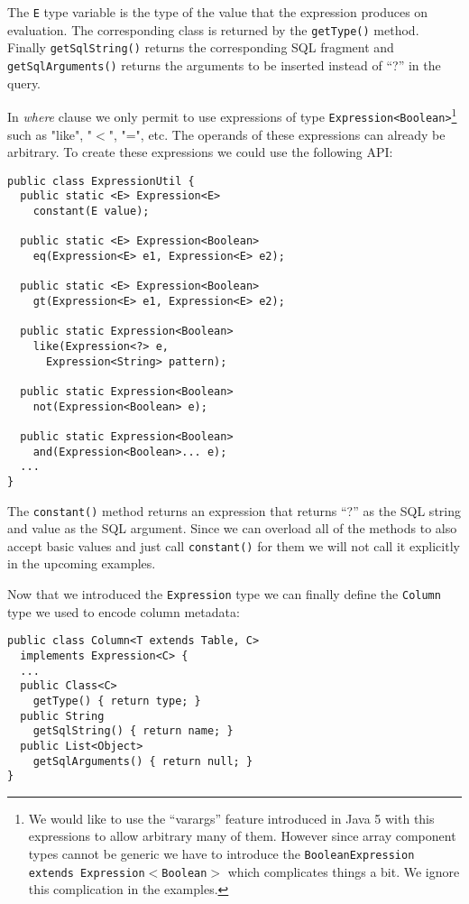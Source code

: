 \documentclass{sig-alternate}
\begin{document}
The \verb!E! type variable is the type of the value that the expression produces on evaluation. The corresponding class is returned by the \verb!getType()! method. Finally \verb!getSqlString()! returns the corresponding SQL fragment and \verb!getSqlArguments()! returns the arguments to be inserted instead of ``?'' in the query. 

In \emph{where} clause we only permit to use expressions of type \verb!Expression<Boolean>!\footnote{We would like to use the ``varargs'' feature introduced in Java 5 with this expressions to allow arbitrary many of them. However since array component types cannot be generic we have to introduce the \texttt{BooleanExpression extends Expression$<$Boolean$>$} which complicates things a bit. We ignore this complication in the examples.} such as "like", "$<$", "=", etc. The operands of these expressions can already be arbitrary. To create these expressions we could use the following API:

\begin{verbatim}
public class ExpressionUtil {
  public static <E> Expression<E> 
    constant(E value);

  public static <E> Expression<Boolean> 
    eq(Expression<E> e1, Expression<E> e2);

  public static <E> Expression<Boolean> 
    gt(Expression<E> e1, Expression<E> e2);

  public static Expression<Boolean> 
    like(Expression<?> e,
      Expression<String> pattern);

  public static Expression<Boolean> 
    not(Expression<Boolean> e);

  public static Expression<Boolean> 
    and(Expression<Boolean>... e);
  ...
}
\end{verbatim}

The \verb!constant()! method returns an expression that returns ``?'' as the SQL string and value as the SQL argument. Since we can overload all of the methods to also accept basic values and just call \verb!constant()! for them we will not call it explicitly in the upcoming examples.

Now that we introduced the \verb!Expression! type we can finally define the \verb!Column! type we used to encode column metadata:

\begin{verbatim}
public class Column<T extends Table, C> 
  implements Expression<C> {
  ...
  public Class<C> 
    getType() { return type; }
  public String 
    getSqlString() { return name; }
  public List<Object> 
    getSqlArguments() { return null; }		
}
\end{verbatim}
\end{document}
